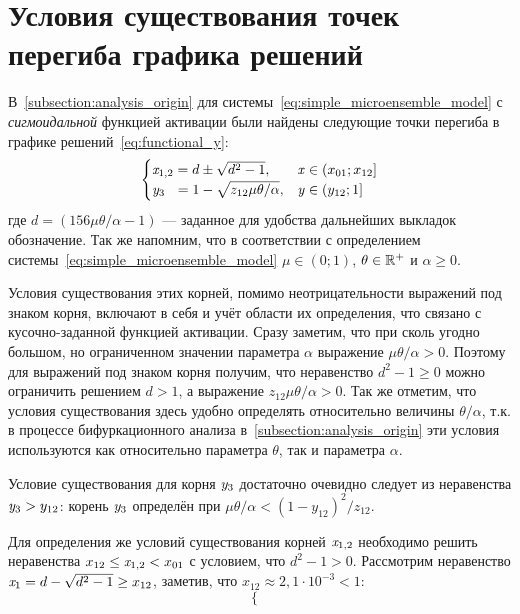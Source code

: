 \section{Условия существования точек перегиба графика решений}  \label{appendix:origin_roots_existance}

В~\autoref{subsection:analysis_origin} для системы~\eqref{eq:simple_microensemble_model} с \textit{сигмоидальной} функцией активации были найдены следующие точки перегиба в графике решений~\eqref{eq:functional_y}:
\begin{equation}
    \nonumber
    \begin{cases}
        \mathit{x}_{1,2} = d \pm \sqrt{d^{2} - 1},                              & \mathit{x} \in \left(x_{01}; x_{12}\right] \\
        \mathit{y}_{3\phantom{,4}}   = 1 - \sqrt{z_{12} \mu \theta / \alpha},   & \mathit{y} \in \left(y_{12}; 1\right] \\
    \end{cases}
\end{equation}
где $d = \left( 156 \mu \theta / \alpha - 1\right)$ --- заданное для удобства дальнейших выкладок обозначение. Так же напомним, что в соответствии с определением системы~\eqref{eq:simple_microensemble_model} $\mu \in (0;1)$, $\theta \in \mathbb{R}^{+}$ и $\alpha \ge 0$.

Условия существования этих корней, помимо неотрицательности выражений под знаком корня, включают в себя и учёт области их определения, что связано с кусочно-заданной функцией активации. Сразу заметим, что при сколь угодно большом, но ограниченном значении параметра $\alpha$ выражение $\mu \theta / \alpha > 0$. Поэтому для выражений под знаком корня получим, что неравенство $d^{2} - 1 \ge 0$ можно ограничить решением $d > 1$, а выражение $z_{12} \mu \theta / \alpha > 0$. Так же отметим, что условия существования здесь удобно определять относительно величины $\theta / \alpha$, т.к. в процессе бифуркационного анализа в~\autoref{subsection:analysis_origin} эти условия используются как относительно параметра $\theta$, так и параметра $\alpha$.

Условие существования для корня $\mathit{y}_{3}$ достаточно очевидно следует из неравенства $\mathit{y}_{3} > y_{12}$: корень $\mathit{y}_{3}$ определён при $\mu \theta / \alpha < \left(1 - y_{12}\right)^{2} / z_{12}$.

Для определения же условий существования корней $\mathit{x}_{1,2}$ необходимо решить неравенства $x_{12} \le \mathit{x}_{1,2} < x_{01}$ с условием, что $d^{2} - 1 > 0$. Рассмотрим неравенство $\mathit{x}_{1} = d - \sqrt{d^{2} - 1} \ge x_{12}$, заметив, что $x_{12} \approx 2,1 \cdot 10^{-3} < 1$:
\begin{equation}
    \nonumber
    \begin{cases}
        
    \end{cases}
\end{equation}

